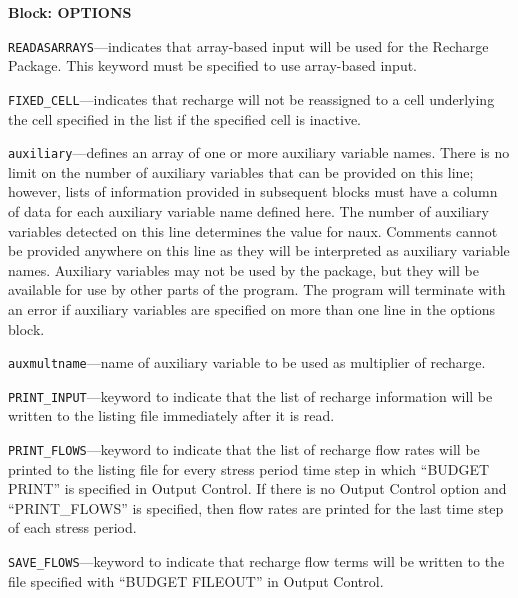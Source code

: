 
\item \textbf{Block: OPTIONS}

\begin{description}
\item \texttt{READASARRAYS}---indicates that array-based input will be used for the Recharge Package.  This keyword must be specified to use array-based input.

\item \texttt{FIXED\_CELL}---indicates that recharge will not be reassigned to a cell underlying the cell specified in the list if the specified cell is inactive.

\item \texttt{auxiliary}---defines an array of one or more auxiliary variable names.  There is no limit on the number of auxiliary variables that can be provided on this line; however, lists of information provided in subsequent blocks must have a column of data for each auxiliary variable name defined here.   The number of auxiliary variables detected on this line determines the value for naux.  Comments cannot be provided anywhere on this line as they will be interpreted as auxiliary variable names.  Auxiliary variables may not be used by the package, but they will be available for use by other parts of the program.  The program will terminate with an error if auxiliary variables are specified on more than one line in the options block.

\item \texttt{auxmultname}---name of auxiliary variable to be used as multiplier of recharge.

\item \texttt{PRINT\_INPUT}---keyword to indicate that the list of recharge information will be written to the listing file immediately after it is read.

\item \texttt{PRINT\_FLOWS}---keyword to indicate that the list of recharge flow rates will be printed to the listing file for every stress period time step in which ``BUDGET PRINT'' is specified in Output Control.  If there is no Output Control option and ``PRINT\_FLOWS'' is specified, then flow rates are printed for the last time step of each stress period.

\item \texttt{SAVE\_FLOWS}---keyword to indicate that recharge flow terms will be written to the file specified with ``BUDGET FILEOUT'' in Output Control.


\end{description}
